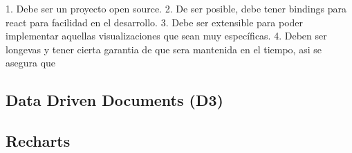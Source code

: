 1. Debe ser un proyecto open source.
2. De ser posible, debe tener bindings para react para facilidad en el desarrollo.
3. Debe ser extensible para poder implementar aquellas visualizaciones que sean muy específicas.
4. Deben ser longevas y tener cierta garantia de que sera mantenida en el tiempo, asi se asegura que 

\subsection{ Data Driven Documents (D3) }

\subsection{ Recharts }

\subsection{  }

